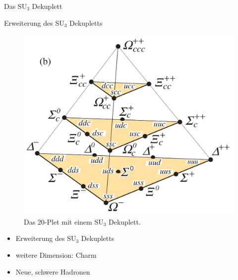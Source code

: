 \documentclass[aspectratio=169]{beamer} %
\begin{document}
\begin{frame}{Das SU\(_3\) Dekuplett}
\begin{minipage}{0.38\textwidth}
        \end{minipage}
    \end{frame}
    
    \begin{frame}{Erweiterung des SU\(_3\) Dekupletts}
      \begin{minipage}{0.6\textwidth}
      \begin{figure}
        \centering
        \includegraphics[width=\linewidth, height=0.7\textheight, keepaspectratio]{Images/594e59cc-d7ab-4a37-ad49-f782ae1831bc.jpg}
        \caption{Das 20-Plet mit einem SU$_3$ Dekuplett.\\\scriptsize\parencite{C.Amsler.2017}}
        \end{figure}
      \end{minipage}
      \hfill
      \begin{minipage}{0.38\textwidth}
        \begin{itemize}
          \item Erweiterung des SU$_3$ Dekupletts
          \item weitere Dimension: Charm
          \item Neue, schwere Hadronen
            \end{itemize}
          \end{minipage}
      \end{frame}
\end{document}
